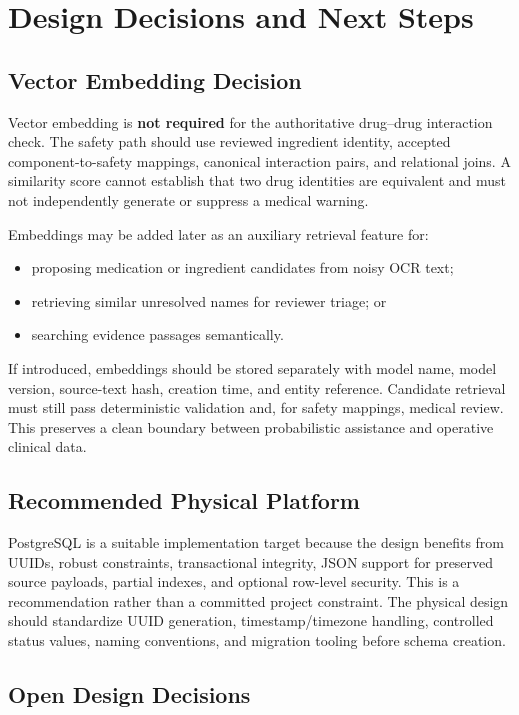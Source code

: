 \section{Design Decisions and Next Steps}

\subsection{Vector Embedding Decision}

Vector embedding is \textbf{not required} for the authoritative drug--drug interaction check. The safety path should use reviewed ingredient identity, accepted component-to-safety mappings, canonical interaction pairs, and relational joins. A similarity score cannot establish that two drug identities are equivalent and must not independently generate or suppress a medical warning.

Embeddings may be added later as an auxiliary retrieval feature for:
\begin{itemize}
  \item proposing medication or ingredient candidates from noisy OCR text;
  \item retrieving similar unresolved names for reviewer triage; or
  \item searching evidence passages semantically.
\end{itemize}

If introduced, embeddings should be stored separately with model name, model version, source-text hash, creation time, and entity reference. Candidate retrieval must still pass deterministic validation and, for safety mappings, medical review. This preserves a clean boundary between probabilistic assistance and operative clinical data.

\subsection{Recommended Physical Platform}

PostgreSQL is a suitable implementation target because the design benefits from UUIDs, robust constraints, transactional integrity, JSON support for preserved source payloads, partial indexes, and optional row-level security. This is a recommendation rather than a committed project constraint. The physical design should standardize UUID generation, timestamp/timezone handling, controlled status values, naming conventions, and migration tooling before schema creation.

\subsection{Open Design Decisions}

